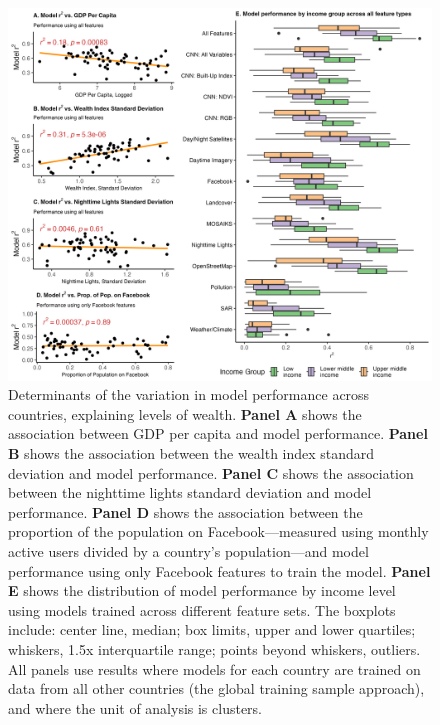 \documentclass{article}
\begin{document}
\begin{figure}[H]
    \centering
    \includegraphics[width=1\textwidth]{figures/explain_var_in_r2.png}
    \caption{Determinants of the variation in model performance across countries, explaining levels of wealth. {\bf Panel A} shows the association between GDP per capita and model performance. {\bf Panel B} shows the association between the wealth index standard deviation and model performance. {\bf Panel C} shows the association between the nighttime lights standard deviation and model performance. {\bf Panel D} shows the association between the proportion of the population on Facebook---measured using monthly active users divided by a country's population---and model performance using only Facebook features to train the model. {\bf Panel E} shows the distribution of model performance by income level using models trained across different feature sets. The boxplots include: center line, median; box limits, upper and lower quartiles; whiskers, 1.5x interquartile range; points beyond whiskers, outliers. All panels use results where models for each country are trained on data from all other countries (the global training sample approach), and where the unit of analysis is clusters.}
     \label{fig:explain_var_in_r2}
\end{figure}
\end{document}
